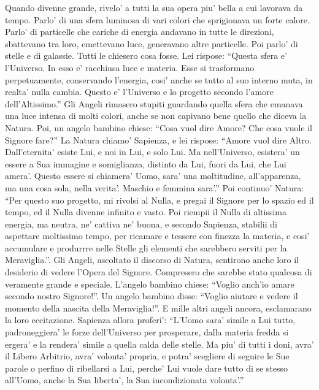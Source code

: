 {Quando divenne grande, rivelo' a tutti la sua opera piu' bella a cui lavorava da tempo. Parlo' di una sfera luminosa di vari colori che sprigionava un forte calore. Parlo' di particelle che cariche di energia andavano in tutte le direzioni, sbattevano tra loro, emettevano luce, generavano altre particelle. Poi parlo' di stelle e di galassie.
Tutti le chiesero cosa fosse.
Lei rispose: \enquote{Questa sfera e' l'Universo. In esso e' racchiusa luce e materia. Esse si trasformano perpetuamente, conservando l'energia, cosi' anche se tutto al suo interno muta, in realta' nulla cambia. Questo e' l'Universo e lo progetto secondo l'amore dell'Altissimo.}
Gli Angeli rimasero stupiti guardando quella sfera che emanava una luce intensa di molti colori, anche se non capivano bene quello che diceva la Natura.
Poi, un angelo bambino chiese: \enquote{Cosa vuol dire Amore? Che cosa vuole il Signore fare?}
La Natura chiamo' Sapienza, e lei rispose: \enquote{Amore vuol dire Altro. Dall'eternita' esiste Lui, e noi in Lui, e solo Lui. Ma nell'Universo, esistera' un essere a Sua immagine e somiglianza, distinto da Lui, fuori da Lui, che Lui amera'. Questo essere si chiamera' Uomo, sara' una moltitudine, all'apparenza, ma una cosa sola, nella verita'. Maschio e femmina sara'.} 
Poi continuo' Natura: \enquote{Per questo suo progetto, mi rivolsi al Nulla, e pregai il Signore per lo spazio ed il tempo, ed il Nulla divenne infinito e vasto. Poi riempii il Nulla di altissima energia, ma neutra, ne' cattiva ne' buona, e secondo Sapienza, stabilii di aspettare moltissimo tempo, per ricamare e tessere con finezza la materia, e cosi' accumulare e produrrre nelle Stelle gli elementi che sarebbero serviti per la Meraviglia.}.
  Gli Angeli, ascoltato il discorso di Natura, sentirono anche loro il desiderio di vedere l'Opera del Signore. Compresero che sarebbe stato qualcosa di veramente grande e speciale.
  L'angelo bambino chiese: \enquote{Voglio anch'io amare secondo nostro Signore!}. Un angelo bambino disse: \enquote{Voglio aiutare e vedere il momento della nascita della Meraviglia!}. E mille altri angeli ancora, esclamarano la loro eccitazione.
  Sapienza allora proferi': 
\enquote{L'Uomo sara' simile a Lui tutto, padroneggiera' le forze dell'Universo per prosperare, dalla materia fredda si ergera' e la rendera' simile a quella calda delle stelle. Ma piu' di tutti i doni, avra' il Libero Arbitrio, avra' volonta' propria, e potra' scegliere di seguire le Sue parole o perfino di ribellarsi a Lui, perche' Lui vuole dare tutto di se stesso all'Uomo, anche la Sua liberta', la Sua incondizionata volonta'.}
}
